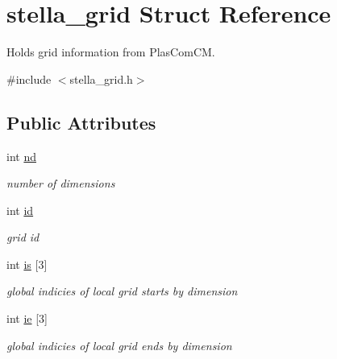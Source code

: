 \hypertarget{structstella__grid}{}\section{stella\+\_\+grid Struct Reference}
\label{structstella__grid}


Holds grid information from Plas\+Com\+CM.  




{\ttfamily \#include $<$stella\+\_\+grid.\+h$>$}

\subsection*{Public Attributes}
\begin{DoxyCompactItemize}
\item 
\mbox{\label{structstella__grid_a0ddfdd7b1459b3087fa1d967af299007}} 
int \mbox{\hyperlink{structstella__grid_a0ddfdd7b1459b3087fa1d967af299007}{nd}}
\begin{DoxyCompactList}\small\item\em number of dimensions \end{DoxyCompactList}\item 
\mbox{\label{structstella__grid_ab61ffb667d6d32a3b629bab6e513ffb8}} 
int \mbox{\hyperlink{structstella__grid_ab61ffb667d6d32a3b629bab6e513ffb8}{id}}
\begin{DoxyCompactList}\small\item\em grid id \end{DoxyCompactList}\item 
\mbox{\label{structstella__grid_a7604c64f87035bf528be4c95b25b16cc}} 
int \mbox{\hyperlink{structstella__grid_a7604c64f87035bf528be4c95b25b16cc}{is}} \mbox{[}3\mbox{]}
\begin{DoxyCompactList}\small\item\em global indicies of local grid starts by dimension \end{DoxyCompactList}\item 
\mbox{\label{structstella__grid_a53051f7c69d6443f1dda4c6e9bc9aba1}} 
int \mbox{\hyperlink{structstella__grid_a53051f7c69d6443f1dda4c6e9bc9aba1}{ie}} \mbox{[}3\mbox{]}
\begin{DoxyCompactList}\small\item\em global indicies of local grid ends by dimension \end{DoxyCompactList}\item 

\end{DoxyCompactItemize}
